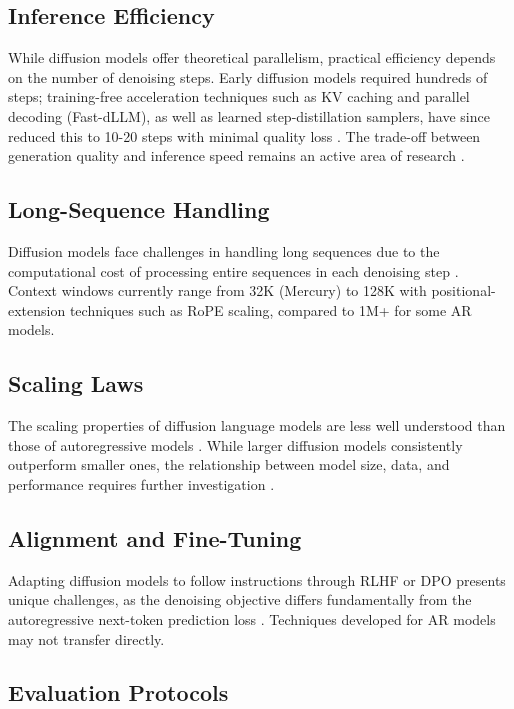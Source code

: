 \documentclass[11pt]{article}
\begin{document}
\subsection{Inference Efficiency}

While diffusion models offer theoretical parallelism, practical efficiency depends on the number of denoising steps. Early diffusion models required hundreds of steps; training-free acceleration techniques such as KV caching and parallel decoding (Fast-dLLM), as well as learned step-distillation samplers, have since reduced this to 10-20 steps with minimal quality loss \cite{wu2025fastdllm, fu2025efficientdlm}. The trade-off between generation quality and inference speed remains an active area of research \cite{li2025surveydlm}.

\subsection{Long-Sequence Handling}

Diffusion models face challenges in handling long sequences due to the computational cost of processing entire sequences in each denoising step \cite{li2025surveydlm}. Context windows currently range from 32K (Mercury) \cite{khanna2025mercury} to 128K with positional-extension techniques such as RoPE scaling, compared to 1M+ for some AR models.

\subsection{Scaling Laws}

The scaling properties of diffusion language models are less well understood than those of autoregressive models \cite{khanna2025mercury}. While larger diffusion models consistently outperform smaller ones, the relationship between model size, data, and performance requires further investigation \cite{yu2025discrete}.

\subsection{Alignment and Fine-Tuning}

Adapting diffusion models to follow instructions through RLHF or DPO presents unique challenges, as the denoising objective differs fundamentally from the autoregressive next-token prediction loss \cite{khanna2025mercury}. Techniques developed for AR models may not transfer directly.

\subsection{Evaluation Protocols}
\end{document}
